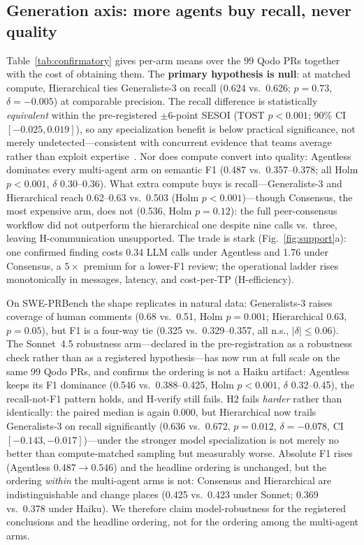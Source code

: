 \documentclass[conference]{IEEEtran}
\begin{document}
\subsection{Generation axis: more agents buy recall, never quality}
\label{sec:generation}
Table~\ref{tab:confirmatory} gives per-arm means over the 99 Qodo PRs together
with the cost of obtaining them. The \textbf{primary hypothesis is null}: at
matched compute, Hierarchical ties Generalists-3 on recall (0.624 vs.\ 0.626;
$p{=}0.73$, $\delta{=}{-}0.005$) at comparable precision. The recall difference
is statistically \emph{equivalent} within the pre-registered $\pm6$-point SESOI
(TOST $p{<}0.001$; $90\%$ CI $[-0.025,0.019]$), so any specialization benefit is
below practical significance, not merely undetected---consistent with concurrent
evidence that teams average rather than exploit expertise~\cite{pappu}. Nor does compute
convert into quality: Agentless dominates every multi-agent arm on semantic F1
(0.487 vs.\ 0.357--0.378; all Holm $p{<}0.001$, $\delta$ 0.30--0.36). What extra
compute buys is recall---Generalists-3 and Hierarchical reach 0.62--0.63 vs.\
0.503 (Holm $p{<}0.001$)---though Consensus, the most expensive arm, does not
(0.536, Holm $p{=}0.12$): the full peer-consensus workflow did not outperform the
hierarchical one despite nine calls vs.\ three, leaving H-communication
unsupported. The trade is stark (Fig.~\ref{fig:support}a): one confirmed finding
costs 0.34 LLM calls under Agentless and 1.76 under Consensus, a $5\times$ premium
for a lower-F1 review; the operational ladder rises monotonically in messages,
latency, and cost-per-TP (H-efficiency).

On SWE-PRBench the shape replicates in natural data: Generalists-3 raises
coverage of human comments (0.68 vs.\ 0.51, Holm $p{=}0.001$; Hierarchical 0.63,
$p{=}0.05$), but F1 is a four-way tie (0.325 vs.\ 0.329--0.357, all n.s.,
$|\delta|{\le}0.06$). The Sonnet~4.5 robustness arm---declared in the
pre-registration as a robustness check rather than as a registered
hypothesis---has now run at full scale on the same 99 Qodo PRs, and confirms the
ordering is not a Haiku artifact: Agentless keeps its F1 dominance (0.546 vs.\ 0.388--0.425, Holm
$p{<}0.001$, $\delta$ 0.32--0.45), the recall-not-F1 pattern holds, and H-verify
still fails. H2 fails \emph{harder} rather than identically: the paired median is
again $0.000$, but Hierarchical now trails Generalists-3 on recall significantly
(0.636 vs.\ 0.672, $p{=}0.012$, $\delta{=}{-}0.078$, CI $[-0.143,-0.017]$)---under
the stronger model specialization is not merely no better than compute-matched
sampling but measurably worse. Absolute F1 rises (Agentless $0.487{\to}0.546$)
and the headline ordering is unchanged, but the ordering \emph{within} the
multi-agent arms is not: Consensus and Hierarchical are indistinguishable and
change places (0.425 vs.\ 0.423 under Sonnet; 0.369 vs.\ 0.378 under Haiku). We
therefore claim model-robustness for the registered conclusions and the headline
ordering, not for the ordering among the multi-agent arms.
\end{document}
